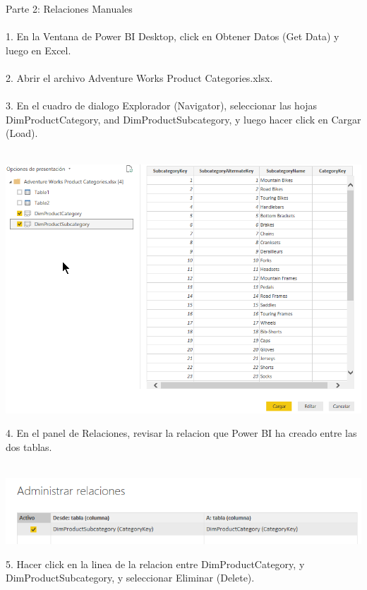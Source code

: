 \documentclass[12pt,letterpaper]{article}
\begin{document}
Parte 2: Relaciones Manuales\\\\
1. En la Ventana de Power BI Desktop, click en Obtener Datos (Get Data) y luego en Excel.\\\\
2. Abrir el archivo Adventure Works Product Categories.xlsx.\\\\
3. En el cuadro de dialogo Explorador (Navigator), seleccionar las hojas DimProductCategory, and
DimProductSubcategory, y luego hacer click en Cargar (Load).\\\\
\begin{center}
\includegraphics[width=15cm]{IMG/5.png} 
\end{center}
4. En el panel de Relaciones, revisar la relacion que Power BI ha creado entre las dos tablas.\\\\
\begin{center}
\includegraphics[width=15cm]{IMG/6.png} 
\end{center}
5. Hacer click en la linea de la relacion entre DimProductCategory, y DimProductSubcategory, y seleccionar
Eliminar (Delete).\\\\
\end{document}
